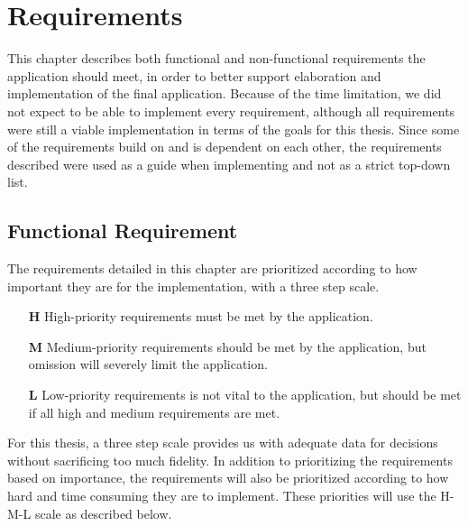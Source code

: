 \chapter{Requirements}
\label{chap:requirements}
This chapter describes both functional and non-functional requirements the application should meet, in order to better support elaboration and implementation of the final application. Because of the time limitation, we did not expect to be able to implement every requirement, although all requirements were still a viable implementation in terms of the goals for this thesis. Since some of the requirements build on and is dependent on each other, the requirements described were used as a guide when implementing and not as a strict top-down list. 

\section{Functional Requirement}
\label{cha:funcreq}
The requirements detailed in this chapter are prioritized according to how important they are for the implementation, with a three step scale. 

\vspace{0.5cm}
\begin{itemize}
    \item[\textbf{H}]{High-priority requirements must be met by the application.} 
    \item[\textbf{M}]{Medium-priority requirements should be met by the application, but omission will severely limit the application.}
    \item[\textbf{L}]{Low-priority requirements is not vital to the application, but should be met if all high and medium requirements are met.}
\end{itemize}
\vspace{0.5cm}

For this thesis, a three step scale provides us with adequate data for decisions without sacrificing too much fidelity.
In addition to prioritizing the requirements based on importance, the requirements will also be prioritized according to how hard and time consuming they are to implement. These priorities will use the H-M-L scale as described below. 

